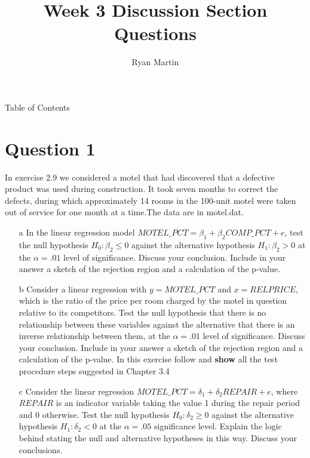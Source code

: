 \documentclass[xcolor={dvipsnames}]{beamer}
\title{ Week 3 Discussion Section Questions }
\author{Ryan Martin}
\begin{document}
	\maketitle


	\begin{frame}{Table of Contents}
		\tableofcontents
	\end{frame}

	\section{Question 1}
	
\begin{frame}[allowframebreaks]{3.6}

In exercise 2.9 we considered a motel that had discovered that a defective product was used during construction. It took seven months to correct the defects, during which approximately 14 rooms in the 100-unit motel were taken out of service for one month at a time.The data are in motel.dat.
	\begin{itemize}

		\item[a] In the linear regression model $MOTEL\_PCT = \beta_1 + \beta_2 COMP\_PCT + e$, test the null hypothesis $H_0: \beta_2 \le 0$ against the alternative hypothesis $H_1: \beta_2 > 0$ at the $\alpha = .01$ level of significance. Discuss your conclusion. Include in your answer a sketch of the rejection region and a calculation of the p-value.
		
			\item[b] Consider a linear regression with $y = MOTEL\_PCT$ and $x = RELPRICE,$ which is the ratio of the price per room charged by the motel in question relative to its competitors. Test the null hypothesis that there is no relationship between these variables against the alternative that there is an inverse relationship between them, at the $\alpha = .01$ level of significance. Discuss your conclusion. Include in your answer a sketch of the rejection region and a calculation of the p-value. In this exercise follow and \textbf{show} all the test procedure steps suggested in Chapter 3.4
			
\item[c] Consider the linear regression $MOTEL\_PCT = \delta_1 + \delta_2 REPAIR + e$, where $REPAIR$ is an indicator variable taking the value 1 during the repair period and 0 otherwise. Test the null hypothesis $H_0: \delta_2 \ge 0$ against the alternative hypothesis $H_1: \delta_2 < 0$ at the $\alpha = .05$ significance level. Explain the logic behind stating the null and alternative hypotheses in this way. Discuss your conclusions.
	

\end{itemize}
\end{frame}
\end{document}
